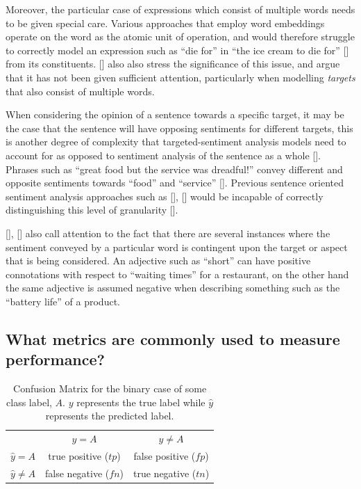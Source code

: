 \documentclass[12pt, a4paper]{report}
\theoremstyle{definition}
\theoremstyle{definition}%
\theoremstyle{definition}%
\theoremstyle{definition}%
\theoremstyle{definition}%
\theoremstyle{definition}%
\renewcommand{\cite}[1]{[\citealp{#1}]}
\begin{document}
Moreover, the particular case of expressions which consist of multiple words needs to be given special care. Various approaches that employ word embeddings operate on the word as the atomic unit of operation, and would therefore struggle to correctly model an expression such as \enquote{die for} in \enquote{the ice cream to die for} \cite{tang2016} from its constituents. \cite{zheng2018} also also stress the significance of this issue, and argue that it has not been given sufficient attention, particularly when modelling \textit{targets} that also consist of multiple words.

When considering the opinion of a sentence towards a specific target, it may be the case that the sentence will have opposing sentiments for different targets, this is another degree of complexity that targeted-sentiment analysis models need to account for as opposed to sentiment analysis of the sentence as a whole \cite{tang}. Phrases such as \enquote{great food but the service was dreadful!} convey different and opposite sentiments towards \enquote{food} and \enquote{service} \cite{tang2016}. Previous sentence oriented sentiment analysis approaches such as \cite{socher2011}, \cite{appel2016} would be incapable of correctly distinguishing this level of granularity \cite{chen2017}.

\cite{dehongma2017}, \cite{wang2018} also call attention to the fact that there are several instances where the sentiment conveyed by a particular word is contingent upon the target or aspect that is being considered. An adjective such as \enquote{short} can have positive connotations with respect to \enquote{waiting times} for a restaurant, on the other hand the same adjective is assumed negative when describing something such as the \enquote{battery life} of a product.

\subsection{What metrics are commonly used to measure performance?}
\begin{table}[h!]
	\centering
	\begin{tabular}{||l c c||}
		\hline
		                 & $y=A$                 & $y\neq{A}$            \\ [0.5ex]
		$\hat{y}=A$      & true positive ($tp$)  & false positive ($fp$) \\
		$\hat{y}\neq{A}$ & false negative ($fn$) & true negative ($tn$)  \\
		\hline
	\end{tabular}
	\caption{Confusion Matrix for the binary case of some class label, $A$. $y$ represents the true label while $\hat{y}$ represents the predicted label.}
	\label{table:confusion_matrix}
\end{table}
\end{document}

